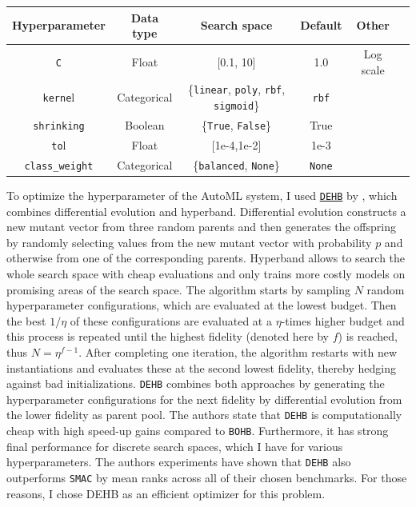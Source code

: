 \documentclass[11pt]{article}
\begin{document}
\vspace{-0.3cm}
\begin{table}[H]
\centering
\begin{tabular}{ | c | c | c | c | c | c | }
 \hline
  Hyperparameter & Data type & Search space & Default & Other \\
 \hline
 \texttt{C} & Float & [0.1, 10]  & 1.0 & Log scale \\ 
 \texttt{kerne}l & Categorical & \{\texttt{linear}, \texttt{poly}, \texttt{rbf}, \texttt{sigmoid}\}  & \texttt{rbf} &   \\ 
 \texttt{shrinking} & Boolean & \{\texttt{True}, \texttt{False}\} & True &  \\ 
 \texttt{to}l & Float & [1e-4,1e-2] & 1e-3 &  \\ 
 \texttt{class\_weight} & Categorical & \{\texttt{balanced}, \texttt{None}\}  & \texttt{None} &  \\ 
 \hline
\end{tabular}
\end{table}
\vspace{-0.3cm}

To optimize the hyperparameter of the AutoML system, I used \href{https://github.com/automl/dehb}{\texttt{DEHB}} by \citet{dehb}, which combines differential evolution and hyperband. Differential evolution constructs a new mutant vector from three random parents and then generates the offspring by randomly selecting values from the new mutant vector with probability $p$ and otherwise from one of the corresponding parents. Hyperband allows to search the whole search space with cheap evaluations and only trains more costly models on promising areas of the search space. The algorithm starts by sampling $N$ random hyperparameter configurations, which are evaluated at the lowest budget. Then the best $1/\eta$ of these configurations are evaluated at a $\eta$-times higher budget and this process is repeated until the highest fidelity (denoted here by $f$) is reached, thus $N=\eta^{f-1}$. After completing one iteration, the algorithm restarts with new instantiations and evaluates these at the second lowest fidelity, thereby hedging against bad initializations. \texttt{DEHB} combines both approaches by generating the hyperparameter configurations for the next fidelity by differential evolution from the lower fidelity as parent pool. The authors state that \texttt{DEHB} is computationally cheap with high speed-up gains compared to \texttt{BOHB}. Furthermore, it has strong final performance for discrete search spaces, which I have for various hyperparameters. The authors experiments have shown that \texttt{DEHB} also outperforms \texttt{SMAC} by mean ranks across all of their chosen benchmarks. For those reasons, I chose DEHB as an efficient optimizer for this problem. \\
\end{document}
